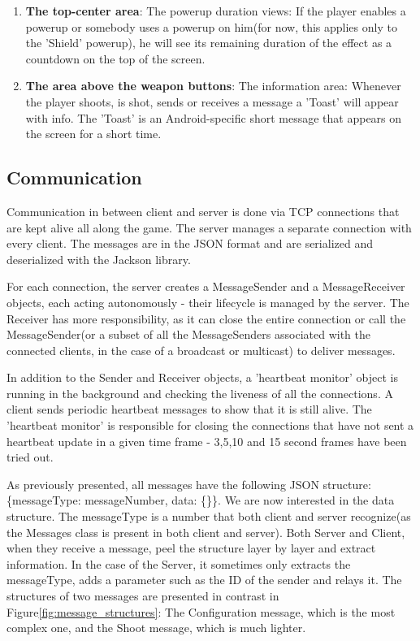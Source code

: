\begin{enumerate}
  \item \textbf{The top-center area}: The powerup duration views: If the player
  enables a powerup or somebody uses a powerup on him(for now, this applies only
  to the 'Shield' powerup), he will see its remaining duration of the effect
  as a countdown on the top of the screen.
  
  \item \textbf{The area above the weapon buttons}: The information area:
  Whenever the player shoots, is shot, sends or receives a message a 'Toast'
  will appear with info. The 'Toast' is an Android-specific short message that
  appears on the screen for a short time.
  
\end{enumerate}


\subsection{Communication}

Communication in between client and server is done via TCP connections that are
kept alive all along the game. The server manages a separate connection with
every client. The messages are in the JSON format and are serialized and
deserialized with the Jackson library.\newline

For each connection, the server creates a MessageSender and a MessageReceiver
objects, each acting autonomously - their lifecycle is managed by the server.
The Receiver has more responsibility, as it can close the entire connection
or call the MessageSender(or a subset of all the MessageSenders associated with
the connected clients, in the case of a broadcast or multicast) to deliver
messages.\newline

In addition to the Sender and Receiver objects, a 'heartbeat monitor' object is
running in the background and checking the liveness of all the connections. A
client sends periodic heartbeat messages to show that it is still alive. The
'heartbeat monitor' is responsible for closing the connections that have not
sent a heartbeat update in a given time frame - 3,5,10 and 15 second frames have
been tried out.\newline

As previously presented, all messages have the following JSON structure:
\{messageType: messageNumber, data: \{\}\}. We are now interested in the data
structure. The messageType is a number that both client and server recognize(as
the Messages class is present in both client and server). Both Server
and Client, when they receive a message, peel the structure layer by
layer and extract information. In the case of the Server, it sometimes
only extracts the messageType, adds a parameter such as the ID of the
sender and relays it. The structures of two messages are presented in
contrast in Figure\ref{fig:message_structures}: The Configuration message,
which is the most complex one, and the Shoot message, which is much lighter.\newline

